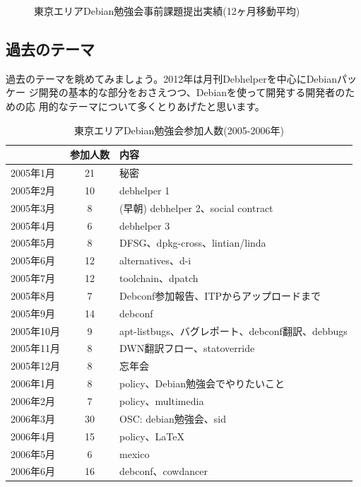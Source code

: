 \documentclass[mingoth,a4paper]{jsarticle}
\begin{document}
\begin{figure}[htbp]
\begin{minipage}{0.5\hsize}
\caption{東京エリアDebian勉強会事前課題提出実績(12ヶ月移動平均)}\label{fig:tokyoprework2012}
  \label{fig:two}
 \end{minipage}
\end{figure}

\subsection{過去のテーマ}

過去のテーマを眺めてみましょう。2012年は月刊Debhelperを中心にDebianパッケー
ジ開発の基本的な部分をおさえつつ、Debianを使って開発する開発者のための応
用的なテーマについて多くとりあげたと思います。

\begin{table}[ht]
\begin{minipage}{0.5\hsize}
 \caption{東京エリアDebian勉強会参加人数(2005-2006年)}\label{tab:count2005}
 \begin{center}
  \begin{tabular}{|l|c|p{10em}|}
 \hline
   & 参加人数 & 内容 \\
 \hline
   2005年1月 & 21 & 秘密\\
   2005年2月 & 10 & debhelper 1\\
   2005年3月 & 8 &  (早朝) debhelper 2、social contract\\
   2005年4月 & 6 & debhelper 3\\
   2005年5月 & 8 & DFSG、dpkg-cross、lintian/linda\\
   2005年6月 & 12 & alternatives、d-i\\
   2005年7月 & 12 & toolchain、dpatch\\
   2005年8月 & 7 & Debconf参加報告、ITPからアップロードまで\\
   2005年9月 & 14 & debconf\\
   2005年10月 & 9 & apt-listbugs、バグレポート、debconf翻訳、debbugs\\
   2005年11月 & 8 & DWN翻訳フロー、statoverride\\
   2005年12月 & 8 & 忘年会\\
   2006年1月 & 8 & policy、Debian勉強会でやりたいこと\\
   2006年2月 & 7 & policy、multimedia \\
   2006年3月 & 30 & OSC: debian勉強会、sid \\
   2006年4月 & 15 & policy、\LaTeX{} \\
   2006年5月 & 6 & mexico \\
   2006年6月 & 16 & debconf、cowdancer\\

\end{tabular}
\end{center}
\end{minipage}
\end{table}
\end{document}
